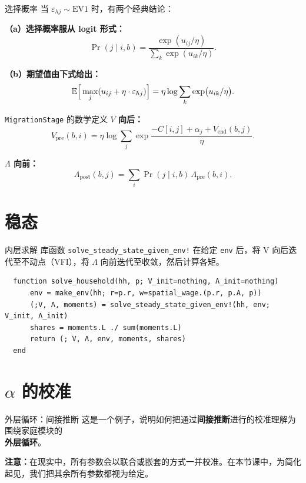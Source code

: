 \documentclass[10pt,aspectratio=169]{beamer}
\begin{document}
\begin{frame}{选择概率}
  当 $\varepsilon_{hj} \sim \text{EV1}$ 时，有两个经典结论：

  \textbf{（a）选择概率服从 logit 形式：}
  \[
  \Pr(j \mid i, b) = \frac{\exp(u_{ij} / \eta)}{\sum_k \exp(u_{ik} / \eta)}.
  \]

  \textbf{（b）期望值由下式给出：}
  \[
  \mathbb{E}\Big[\max_j (u_{ij} + \eta \cdot \varepsilon_{hj})\Big] = \eta \log \sum_k \exp\!\big(u_{ik} / \eta \big).
  \]
\end{frame}

\begin{frame}{\texttt{MigrationStage} 的数学定义}
  \textbf{$V$ 向后：}
  \[
  V_{\text{pre}}(b, i) = \eta \log \sum_j \exp\!\frac{- C[i,j] + \alpha_j + V_{\text{end}}(b, j)}{\eta}.
  \]

  \textbf{$\Lambda$ 向前：}
  \[
  \Lambda_{\text{post}}(b, j) = \sum_i \Pr(j \mid i, b)\, \Lambda_{\text{pre}}(b, i).
  \]
\end{frame}

\section[稳态]{稳态}

\begin{frame}[fragile]{内层求解}
  库函数 \texttt{solve\_steady\_state\_given\_env!} 在给定 \texttt{env} 后，将 V 向后迭代至不动点（VFI），将 $\Lambda$ 向前迭代至收敛，然后计算各矩。

  \begin{lstlisting}
  function solve_household(hh, p; V_init=nothing, Λ_init=nothing)
      env = make_env(hh; r=p.r, w=spatial_wage.(p.r, p.A, p))
      (;V, Λ, moments) = solve_steady_state_given_env!(hh, env; V_init, Λ_init)
      shares = moments.L ./ sum(moments.L)
      return (; V, Λ, env, moments, shares)
  end
  \end{lstlisting}
\end{frame}

\section[$\alpha$ 校准]{$\alpha$ 的校准}

\begin{frame}{外层循环：间接推断}
  这是一个例子，说明如何把通过\textbf{间接推断}进行的校准理解为围绕家庭模块的\\ \textbf{外层循环}。

  \textbf{注意：}在现实中，所有参数会以联合或嵌套的方式一并校准。在本节课中，为简化起见，我们把其余所有参数都视为给定。
\end{frame}
\end{document}
